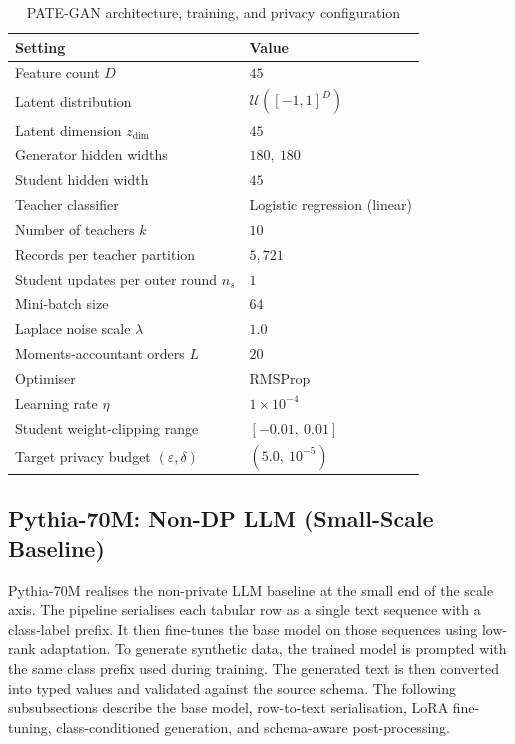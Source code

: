 \begin{table}[h]
\centering
\small
\caption{PATE-GAN architecture, training, and privacy configuration}
\label{tab:pategan-hp}
\begin{tabular}{ll}
\toprule
Setting & Value \\
\midrule
Feature count $D$ & $45$ \\
Latent distribution & $\mathcal{U}([-1,1]^{D})$ \\
Latent dimension $z_{\mathrm{dim}}$ & $45$ \\
Generator hidden widths & $180,\ 180$ \\
Student hidden width & $45$ \\
Teacher classifier & Logistic regression (linear) \\
Number of teachers $k$ & $10$ \\
Records per teacher partition & $5{,}721$ \\
Student updates per outer round $n_s$ & $1$ \\
Mini-batch size & $64$ \\
Laplace noise scale $\lambda$ & $1.0$ \\
Moments-accountant orders $L$ & $20$ \\
Optimiser & RMSProp \\
Learning rate $\eta$ & $1\times 10^{-4}$ \\
Student weight-clipping range & $[-0.01,\ 0.01]$ \\
Target privacy budget $(\varepsilon,\delta)$ & $(5.0,\ 10^{-5})$ \\
\bottomrule
\end{tabular}
\end{table}

\subsection{Pythia-70M: Non-DP LLM (Small-Scale Baseline)}
\label{sec:methods:pythia}


Pythia-70M realises the non-private LLM baseline at the small end of the
scale axis. The pipeline serialises each tabular row as a single text
sequence with a class-label prefix. It then fine-tunes the base model 
on those sequences using low-rank
adaptation. To generate synthetic data, the trained model is prompted with the same
class prefix used during training. The generated text is then converted
into typed values and validated against the source schema. The following
subsubsections describe the base model, row-to-text serialisation, LoRA
fine-tuning, class-conditioned generation, and schema-aware
post-processing.

